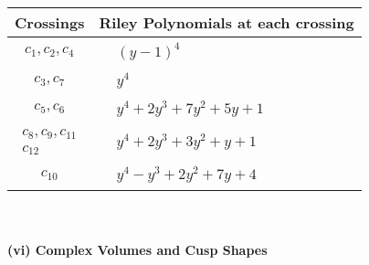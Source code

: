 \documentclass[1p]{elsarticle_modified}
\theoremstyle{definition}
\begin{document}
\begin{tabular}{m{50pt}|m{274pt}}
Crossings & \hspace{64pt}Riley Polynomials at each crossing \\
\hline $$\begin{aligned}c_{1},c_{2},c_{4}\end{aligned}$$&$\begin{aligned}
&(y-1)^4
\end{aligned}$\\
\hline $$\begin{aligned}c_{3},c_{7}\end{aligned}$$&$\begin{aligned}
&y^4
\end{aligned}$\\
\hline $$\begin{aligned}c_{5},c_{6}\end{aligned}$$&$\begin{aligned}
&y^4+2 y^3+7 y^2+5 y+1
\end{aligned}$\\
\hline $$\begin{aligned}c_{8},c_{9},c_{11}\\c_{12}\end{aligned}$$&$\begin{aligned}
&y^4+2 y^3+3 y^2+y+1
\end{aligned}$\\
\hline $$\begin{aligned}c_{10}\end{aligned}$$&$\begin{aligned}
&y^4- y^3+2 y^2+7 y+4
\end{aligned}$\\
\hline
\end{tabular}\\~\\
\newpage\flushleft \textbf{(vi) Complex Volumes and Cusp Shapes}
\end{document}
